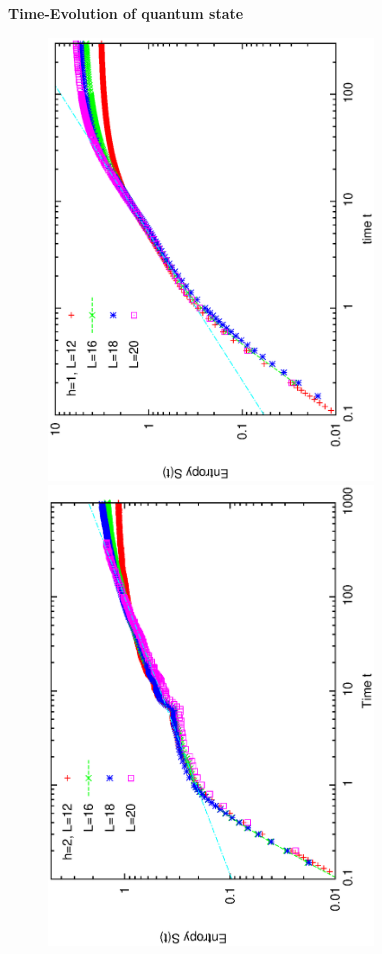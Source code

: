 \documentclass[prl,aps,epsf,showpacs,twocolumn]{revtex4}
\begin{document}
{\bf Time-Evolution of quantum state}



\begin{figure}[b]
 \includegraphics[angle=-90,width=3.4in]{newfig1c.ps}\\
\vspace{-0.10in}
 \includegraphics[angle=-90,width=3.4in]{newfig1d.ps}\\

\end{figure}
\end{document}
